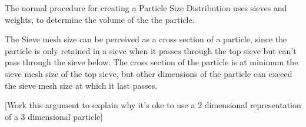 
The normal procedure for creating a Particle Size Distribution uses sieves and weights, to determine the volume of the the particle.

The Sieve mesh size can be perceived as a cross section of a particle, since the particle is only retained in a sieve when it passes through the top sieve but can't pass through the sieve below. The cross section of the particle is at minimum the sieve mesh size of the top sieve, but other dimensions of the particle can exceed the sieve mesh size at which it last passes.

[Work this argument to explain why it's oke to use a 2 dimensional representation of a 3 dimensional particle]